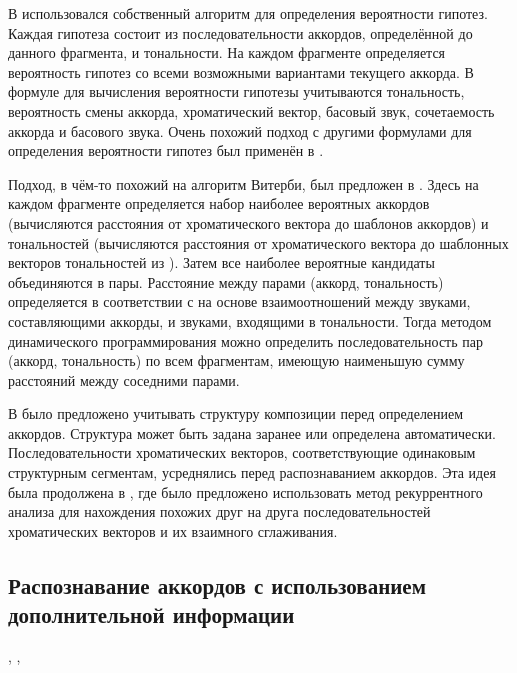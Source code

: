 В \cite{Yoshioka2004} использовался собственный алгоритм для определения
вероятности гипотез. Каждая гипотеза состоит из последовательности аккордов,
определённой до данного фрагмента, и тональности. На каждом фрагменте
определяется вероятность гипотез со всеми возможными вариантами текущего
аккорда. В формуле для вычисления вероятности гипотезы учитываются тональность,
вероятность смены аккорда, хроматический вектор, басовый звук, сочетаемость
аккорда и басового звука. Очень похожий подход с другими формулами для
определения вероятности гипотез был применён в \cite{Sumi2008}.

Подход, в чём-то похожий на алгоритм Витерби, был предложен в \cite{Rocher2010}.
Здесь на каждом фрагменте определяется набор наиболее вероятных аккордов
(вычисляются расстояния от хроматического вектора до шаблонов аккордов) и
тональностей (вычисляются расстояния от хроматического вектора до шаблонных
векторов тональностей из \cite{Temperley2001}). Затем все наиболее вероятные
кандидаты объединяются в пары. Расстояние между парами (аккорд, тональность)
определяется в соответствии с \cite{Lerdahl2001} на основе взаимоотношений
между звуками, составляющими аккорды, и звуками, входящими в тональности. Тогда
методом динамического программирования можно определить последовательность пар
(аккорд, тональность) по всем фрагментам, имеющую наименьшую сумму расстояний
между соседними парами.

В \cite{Mauch2009} было предложено учитывать структуру композиции перед
определением аккордов. Структура может быть задана заранее или определена
автоматически. Последовательности хроматических векторов, соответствующие
одинаковым структурным сегментам, усреднялись перед распознаванием аккордов. Эта
идея была продолжена в \cite{Cho2011}, где было предложено использовать метод
рекуррентного анализа для нахождения похожих друг на друга последовательностей
хроматических векторов и их взаимного сглаживания.

\subsection{Распознавание аккордов с использованием дополнительной информации}
\label{ssectT_recconstr}

\cite{Zhang2008}, \cite{Mcvicar2011}, \cite{Hrybyk2010}

\clearpage